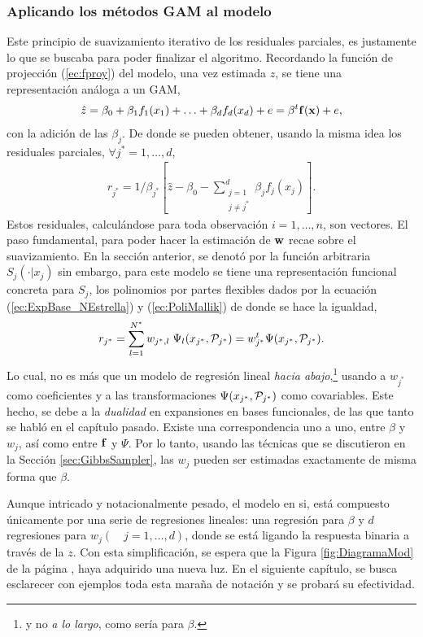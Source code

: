 \documentclass[../Main/Main.tex]{subfiles}
\begin{document}
\subsubsection{Aplicando los métodos GAM al modelo}
Este principio de suavizamiento iterativo de los residuales parciales, es justamente lo que se buscaba para poder finalizar el algoritmo.  Recordando la función de projección (\ref{ec:fproy}) del modelo, una vez estimada $z$, se tiene una representación análoga a un GAM,
\begin{align*}
	\hat{z} = \beta_0 + \beta_1f_1(x_1) + \ldots + \beta_df_d(x_d) + e = \beta^t\fsn(\xsn) + e,
\end{align*}
con la adición de las $\beta_j$. De donde se pueden obtener, usando la misma idea los residuales parciales, $\forall j^*=1,\ldots,d$,
\begin{align}
r_{j^*} = 1/\beta_{j^*}[\hat{z} - \beta_0 - \sum_{\substack{j=1\\ j \neq j^*}}^d \beta_j f_j(x_j)].
\label{ec:ResParciales3}
\end{align}
Estos residuales, calculándose para toda observación $i = 1,\ldots,n$, son vectores. El paso fundamental, para poder hacer la estimación de $\wsn$ recae sobre el suavizamiento. En la sección anterior, se denotó por la función arbitraria $S_j(\cdot|x_j)$ sin embargo, para este modelo se tiene una representación funcional concreta para $S_j$, los polinomios por partes flexibles dados por la ecuación (\ref{ec:ExpBase_NEstrella}) y (\ref{ec:PoliMallik}) de donde se hace la igualdad,
\begin{equation}
	r_{j^*} = \sum_{l = 1}^{N^*} w_{j^*,l} \; \Psi_l(x_{j^*},\P_{j^*}) = w_{j^*}^t\Psi(x_{j^*},\P_{j^*}). \label{ec:RegResiduales}
\end{equation}
Lo cual, no es más que un modelo de regresión lineal \textit{hacia abajo},\footnote{y no \textit{a lo largo}, como sería para $\beta$.} usando a $w_{j^*}$ como coeficientes y a las transformaciones $\Psi(x_{j^*},\P_{j^*})$ como covariables. Este hecho, se debe a la \textit{dualidad} en expansiones en bases funcionales, de las que tanto se habló en el capítulo pasado. Existe una correspondencia uno a uno, entre $\beta$ y $w_j$, así como entre $\fsn$ y $\Psi$. Por lo tanto, usando las técnicas que se discutieron en la Sección \ref{sec:GibbsSampler}, las $w_j$ pueden ser estimadas exactamente de misma forma que $\beta$.

Aunque intricado y notacionalmente pesado, el modelo en si, está compuesto únicamente por una serie de regresiones lineales: una regresión para $\beta$ y $d$ regresiones para $w_j (\quad j = 1,\ldots,d)$, donde se está ligando la respuesta binaria a través de la $z$. Con esta simplificación, se espera que la Figura \ref{fig:DiagramaMod} de la página \pageref{fig:DiagramaMod}, haya adquirido una nueva luz. En el siguiente capítulo, se busca esclarecer con ejemplos toda esta maraña de notación y se probará su efectividad.
\end{document}
